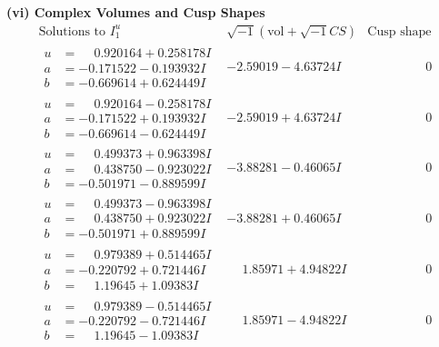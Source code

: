 \documentclass[1p]{elsarticle_modified}
\theoremstyle{definition}
\newcommand{\I}{\sqrt{-1}}
\begin{document}
\newpage\flushleft \textbf{(vi) Complex Volumes and Cusp Shapes}
$$\begin{array}{c|c|c}  
\text{Solutions to }I^u_{1}& \I (\text{vol} + \sqrt{-1}CS) & \text{Cusp shape}\\
 \hline 
\begin{aligned}
u &= \phantom{-}0.920164 + 0.258178 I \\
a &= -0.171522 - 0.193932 I \\
b &= -0.669614 + 0.624449 I\end{aligned}
 & -2.59019 - 4.63724 I & \phantom{-0.000000 } 0 \\ \hline\begin{aligned}
u &= \phantom{-}0.920164 - 0.258178 I \\
a &= -0.171522 + 0.193932 I \\
b &= -0.669614 - 0.624449 I\end{aligned}
 & -2.59019 + 4.63724 I & \phantom{-0.000000 } 0 \\ \hline\begin{aligned}
u &= \phantom{-}0.499373 + 0.963398 I \\
a &= \phantom{-}0.438750 - 0.923022 I \\
b &= -0.501971 - 0.889599 I\end{aligned}
 & -3.88281 - 0.46065 I & \phantom{-0.000000 } 0 \\ \hline\begin{aligned}
u &= \phantom{-}0.499373 - 0.963398 I \\
a &= \phantom{-}0.438750 + 0.923022 I \\
b &= -0.501971 + 0.889599 I\end{aligned}
 & -3.88281 + 0.46065 I & \phantom{-0.000000 } 0 \\ \hline\begin{aligned}
u &= \phantom{-}0.979389 + 0.514465 I \\
a &= -0.220792 + 0.721446 I \\
b &= \phantom{-}1.19645 + 1.09383 I\end{aligned}
 & \phantom{-}1.85971 + 4.94822 I & \phantom{-0.000000 } 0 \\ \hline\begin{aligned}
u &= \phantom{-}0.979389 - 0.514465 I \\
a &= -0.220792 - 0.721446 I \\
b &= \phantom{-}1.19645 - 1.09383 I\end{aligned}
 & \phantom{-}1.85971 - 4.94822 I & \phantom{-0.000000 } 0 \\ \hline\begin{aligned}

\end{aligned}
\end{array}$$
\end{document}
